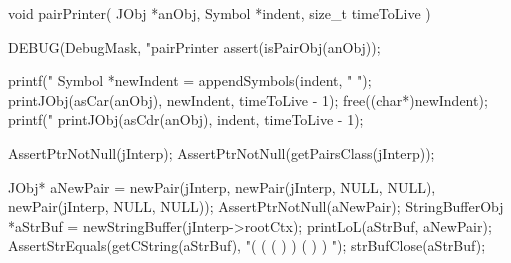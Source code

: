 \startCCode
void pairPrinter(
  JObj   *anObj,
  Symbol *indent,
  size_t  timeToLive
) {
  DEBUG(DebugMask, "pairPrinter %
  assert(isPairObj(anObj));
  
  printf("%
  Symbol *newIndent = appendSymbols(indent, "  ");
  printJObj(asCar(anObj), newIndent, timeToLive - 1);
  free((char*)newIndent);
  printf("%
  printJObj(asCdr(anObj), indent, timeToLive - 1);
}
\stopCCode


\startCTest
  AssertPtrNotNull(jInterp);
  AssertPtrNotNull(getPairsClass(jInterp));

  JObj* aNewPair = newPair(jInterp,
                               newPair(jInterp, NULL, NULL),
                               newPair(jInterp, NULL, NULL));
  AssertPtrNotNull(aNewPair);
  StringBufferObj *aStrBuf = newStringBuffer(jInterp->rootCtx);
  printLoL(aStrBuf, aNewPair);
  AssertStrEquals(getCString(aStrBuf), "( ( ( ) ) ( ) ) ");
  strBufClose(aStrBuf);
\stopCTest
\skipTestCase
\stopTestSuite


